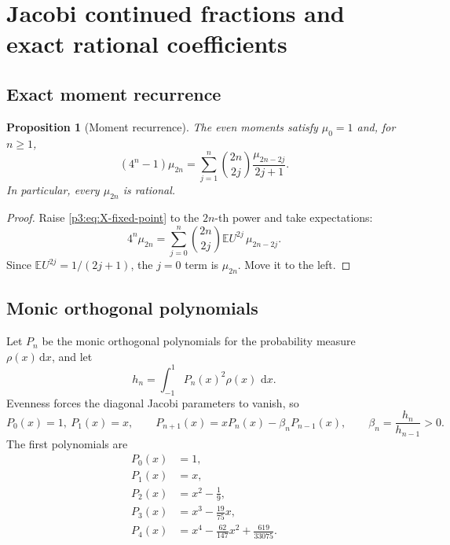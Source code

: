 \documentclass[11pt]{article}
\newtheorem{proposition}[theorem]{Proposition}
\theoremstyle{definition}
\theoremstyle{remark}
\newcommand{\E}{\mathbb E}
\newcommand{\dd}{\,\mathrm d}
\begin{document}
\section{Jacobi continued fractions and exact rational coefficients}\label{p3:sec:jacobi}

\subsection{Exact moment recurrence}

\begin{proposition}[Moment recurrence]\label{p3:prop:moment-recurrence}
The even moments satisfy \(\mu_0=1\) and, for \(n\ge1\),
\begin{equation}
 \boxed{
 (4^n-1)\mu_{2n}
 =\sum_{j=1}^{n}\binom{2n}{2j}\frac{\mu_{2n-2j}}{2j+1}.
 }                                                           \label{p3:eq:moment-recurrence}
\end{equation}
In particular, every \(\mu_{2n}\) is rational.
\end{proposition}

\begin{proof}
Raise \eqref{p3:eq:X-fixed-point} to the \(2n\)-th power and take expectations:
\[
 4^n\mu_{2n}
 =\sum_{j=0}^{n}\binom{2n}{2j}\E U^{2j}\,\mu_{2n-2j}.
\]
Since \(\E U^{2j}=1/(2j+1)\), the \(j=0\) term is \(\mu_{2n}\).  Move it to the left.
\end{proof}

\subsection{Monic orthogonal polynomials}

Let \(P_n\) be the monic orthogonal polynomials for the probability measure
\(\rho(x)\dd x\), and let
\begin{equation}
 h_n=\int_{-1}^{1}P_n(x)^2\rho(x)\,\dd x.                    \label{p3:eq:hn}
\end{equation}
Evenness forces the diagonal Jacobi parameters to vanish, so
\begin{equation}
 P_0(x)=1,\
 P_1(x)=x,
 \qquad
 P_{n+1}(x)=xP_n(x)-\beta_nP_{n-1}(x),
 \qquad
 \beta_n=\frac{h_n}{h_{n-1}}>0.                              \label{p3:eq:monic-recurrence}
\end{equation}
The first polynomials are
\begin{align}
 P_0(x)&=1,\\
 P_1(x)&=x,\\
 P_2(x)&=x^2-\frac19,\\
 P_3(x)&=x^3-\frac{19}{75}x,\\
 P_4(x)&=x^4-\frac{62}{147}x^2+\frac{619}{33075}.
\end{align}
\end{document}
